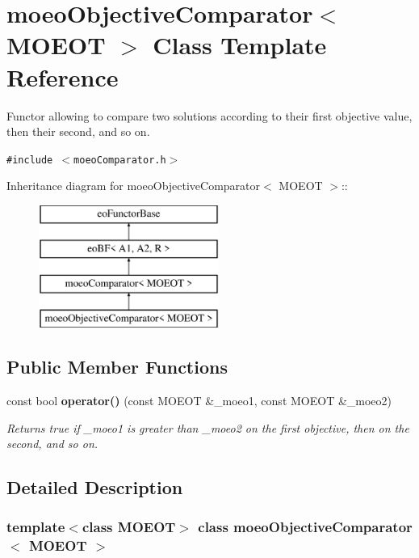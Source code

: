 \section{moeo\-Objective\-Comparator$<$ MOEOT $>$ Class Template Reference}
\label{classmoeoObjectiveComparator}
Functor allowing to compare two solutions according to their first objective value, then their second, and so on.  


{\tt \#include $<$moeo\-Comparator.h$>$}

Inheritance diagram for moeo\-Objective\-Comparator$<$ MOEOT $>$::\begin{figure}[H]
\begin{center}
\leavevmode
\includegraphics[height=4cm]{classmoeoObjectiveComparator}
\end{center}
\end{figure}
\subsection*{Public Member Functions}
\begin{CompactItemize}
\item 
const bool {\bf operator()} (const MOEOT \&\_\-moeo1, const MOEOT \&\_\-moeo2)
\begin{CompactList}\small\item\em Returns true if \_\-moeo1 is greater than \_\-moeo2 on the first objective, then on the second, and so on. \item\end{CompactList}\end{CompactItemize}


\subsection{Detailed Description}
\subsubsection*{template$<$class MOEOT$>$ class moeo\-Objective\-Comparator$<$ MOEOT $>$}

